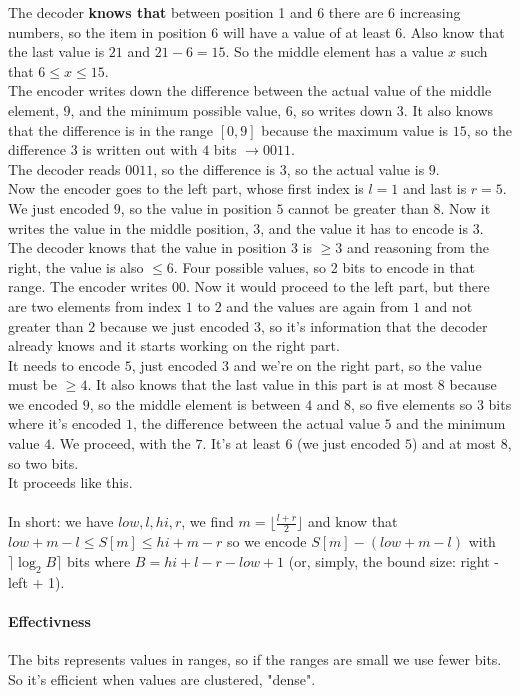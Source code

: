 \documentclass[10pt]{report}
\begin{document}
The decoder \textbf{knows that} between position 1 and 6 there are 6 increasing numbers, so the item in position 6 will have a value of at least $6$. Also know that the last value is $21$ and $21-6 = 15$. So the middle element has a value $x$ such that $6\leq x \leq 15$.\\
The encoder writes down the difference between the actual value of the middle element, $9$, and the minimum possible value, $6$, so writes down $3$. It also knows that the difference is in the range $[0,9]$ because the maximum value is $15$, so the difference $3$ is written out with $4$ bits $\rightarrow 0011$.\\
The decoder reads $0011$, so the difference is $3$, so the actual value is $9$.\\
Now the encoder goes to the left part, whose first index is $l=1$ and last is $r=5$. We just encoded $9$, so the value in position $5$ cannot be greater than $8$. Now it writes the value in the middle position, $3$, and the value it has to encode is $3$.\\
The decoder knows that the value in position $3$ is $\geq 3$ and reasoning from the right, the value is also $\leq 6$. Four possible values, so 2 bits to encode in that range. The encoder writes $00$. Now it would proceed to the left part, but there are two elements from index $1$ to $2$ and the values are again from $1$ and not greater than $2$ because we just encoded $3$, so it's information that the decoder already knows and it starts working on the right part.\\
It needs to encode $5$, just encoded $3$ and we're on the right part, so the value must be $\geq 4$. It also knows that the last value in this part is at most $8$ because we encoded $9$, so the middle element is between $4$ and $8$, so five elements so $3$ bits where it's encoded $1$, the difference between the actual value $5$ and the minimum value $4$. We proceed, with the $7$. It's at least $6$ (we just encoded $5$) and at most $8$, so two bits.\\
It proceeds like this.\\\\
In short: we have $low, l, hi, r$, we find $m = \lfloor\frac{l+r}{2}\rfloor$ and know that $low+m-l\leq S[m]\leq hi + m - r$ so we encode $S[m] - (low + m - l)$ with $\rceil\log_2 B\rceil$ bits where $B = hi + l - r - low +1$ (or, simply, the bound size: right - left + 1).
\paragraph{Effectivness} The bits represents values in ranges, so if the ranges are small we use fewer bits. So it's efficient when values are clustered, "dense".
\end{document}

